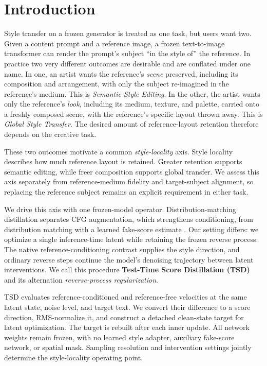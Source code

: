 \section{Introduction}
\label{sec:intro}

Style transfer on a frozen generator is treated as one task, but
users want two. Given a content prompt and a reference image, a frozen
text-to-image transformer can render the prompt's subject ``in the style of''
the reference. In practice two very different outcomes are desirable and are
conflated under one name. In one, an artist wants the reference's
\emph{scene} preserved, including its composition and arrangement, with only the
subject re-imagined in the reference's medium. This is \emph{Semantic Style
Editing}. In the other, the artist wants only the reference's \emph{look},
including its medium, texture, and palette, carried onto a freshly composed
scene, with the reference's specific layout thrown away. This is
\emph{Global Style Transfer}. The desired amount of reference-layout retention therefore depends on
the creative task.

These two outcomes motivate a common \emph{style-locality} axis.
Style locality describes how much reference layout is retained. Greater
retention supports semantic editing, while freer composition supports global
transfer. We assess this axis separately from reference-medium fidelity and
target-subject alignment, so replacing the reference subject remains an
explicit requirement in either task.

We drive this axis with one frozen-model operator. Distribution-matching
distillation separates CFG augmentation, which strengthens conditioning,
from distribution matching with a learned fake-score estimate
\citep{yin2024dmd,liu2025decoupled}. Our setting differs: we optimize a
single inference-time latent while retaining the frozen reverse process.
The native reference-conditioning contrast supplies the style direction,
and ordinary reverse steps continue the model's denoising trajectory
between latent interventions. We call this procedure \textbf{Test-Time
Score Distillation (TSD)} and its alternation \emph{reverse-process
regularization}.

TSD evaluates reference-conditioned and reference-free velocities at the
same latent state, noise level, and target text. We convert their difference
to a score direction, RMS-normalize it, and construct a detached clean-state
target for latent optimization. The target is rebuilt after each inner
update. All network weights remain frozen, with no learned style adapter,
auxiliary fake-score network, or spatial mask. Sampling resolution and
intervention settings jointly determine the style-locality operating point.

